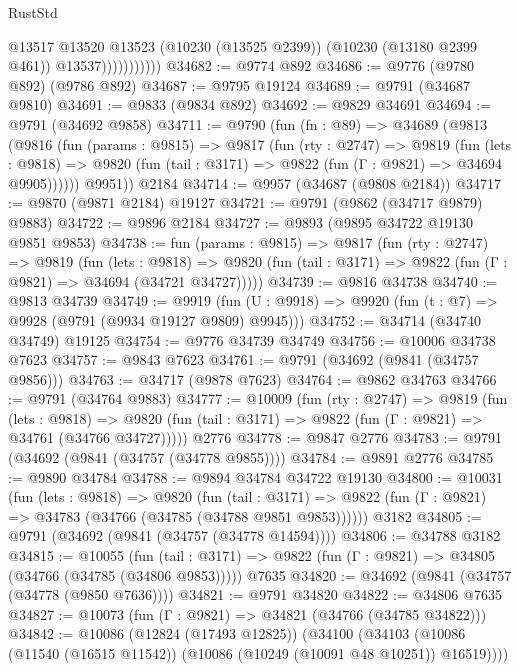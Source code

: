 \begin{lexlean}{RustStd}
\begin{coremodule}
                          @13517
                          @13520
                          @13523
                          (@10230 (@13525 @2399))
                          (@10230 (@13180 @2399 @461))
                          @13537)))))))))))
@34682 := @9774 @892
@34686 := @9776 (@9780 @892) (@9786 @892)
@34687 := @9795 @19124
@34689 := @9791 (@34687 @9810)
@34691 := @9833 (@9834 @892)
@34692 := @9829 @34691
@34694 := @9791 (@34692 @9858)
@34711 := @9790
    (fun (fn : @89) =>
    @34689
      (@9813
        (@9816
          (fun (params : @9815) =>
          @9817
            (fun (rty : @2747) =>
            @9819
              (fun (lets : @9818) =>
              @9820 (fun (tail : @3171) => @9822 (fun (Γ : @9821) => @34694 @9905))))))
        @9951))
    @2184
@34714 := @9957 (@34687 (@9808 @2184))
@34717 := @9870 (@9871 @2184) @19127
@34721 := @9791 (@9862 (@34717 @9879) @9883)
@34722 := @9896 @2184
@34727 := @9893 (@9895 @34722 @19130 @9851 @9853)
@34738 := fun (params : @9815) =>
  @9817
    (fun (rty : @2747) =>
    @9819
      (fun (lets : @9818) =>
      @9820 (fun (tail : @3171) => @9822 (fun (Γ : @9821) => @34694 (@34721 @34727)))))
@34739 := @9816 @34738
@34740 := @9813 @34739
@34749 := @9919
    (fun (U : @9918) => @9920 (fun (t : @7) => @9928 (@9791 (@9934 @19127 @9809) @9945)))
@34752 := @34714 (@34740 @34749) @19125
@34754 := @9776 @34739 @34749
@34756 := @10006 @34738 @7623
@34757 := @9843 @7623
@34761 := @9791 (@34692 (@9841 (@34757 @9856)))
@34763 := @34717 (@9878 @7623)
@34764 := @9862 @34763
@34766 := @9791 (@34764 @9883)
@34777 := @10009
    (fun (rty : @2747) =>
    @9819
      (fun (lets : @9818) =>
      @9820 (fun (tail : @3171) => @9822 (fun (Γ : @9821) => @34761 (@34766 @34727)))))
    @2776
@34778 := @9847 @2776
@34783 := @9791 (@34692 (@9841 (@34757 (@34778 @9855))))
@34784 := @9891 @2776
@34785 := @9890 @34784
@34788 := @9894 @34784 @34722 @19130
@34800 := @10031
    (fun (lets : @9818) =>
    @9820
      (fun (tail : @3171) =>
      @9822 (fun (Γ : @9821) => @34783 (@34766 (@34785 (@34788 @9851 @9853))))))
    @3182
@34805 := @9791 (@34692 (@9841 (@34757 (@34778 @14594))))
@34806 := @34788 @3182
@34815 := @10055
    (fun (tail : @3171) => @9822 (fun (Γ : @9821) => @34805 (@34766 (@34785 (@34806 @9853)))))
    @7635
@34820 := @34692 (@9841 (@34757 (@34778 (@9850 @7636))))
@34821 := @9791 @34820
@34822 := @34806 @7635
@34827 := @10073 (fun (Γ : @9821) => @34821 (@34766 (@34785 @34822)))
@34842 := @10086
    (@12824 (@17493 @12825))
    (@34100 (@34103 (@10086 (@11540 (@16515 @11542)) (@10086 (@10249 (@10091 @48 @10251)) @16519))))

\end{coremodule}
\end{lexlean}
